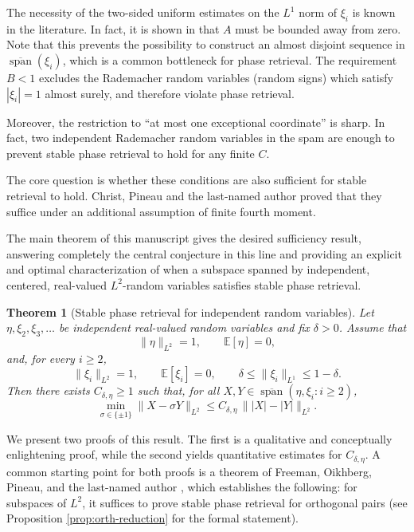\documentclass[11pt]{amsart}
\numberwithin{equation}{section}
\newtheorem{theorem}{Theorem}[section]
\theoremstyle{definition}
\theoremstyle{remark}
\newcommand{\E}{\mathbb E}
\newcommand{\Span}{\operatorname{span}}
\newcommand{\abs}[1]{\lvert #1 \rvert}
\newcommand{\norm}[1]{\lVert #1 \rVert}
\begin{document}
The necessity of the two-sided uniform estimates on the $L^1$ norm of $\xi_i$ is known in the literature. In fact, it is shown in \cite{FOTP} that $A$ must be bounded away from zero. Note that this prevents the possibility to construct an almost disjoint sequence in $\overline{\Span}(\xi_i)$, which is a common bottleneck for phase retrieval. The requirement $B<1$ excludes the Rademacher
random variables (random signs) which satisfy $|\xi_i|=1$ almost surely, and therefore violate phase retrieval.

Moreover, the restriction to “at most one exceptional coordinate” is sharp. In fact, two independent Rademacher random variables in the spam are enough to prevent stable phase retrieval to hold for any finite $C$. 

The core question is whether these conditions are also sufficient for stable retrieval to hold. Christ, Pineau and the last-named author \cite{christ2022examples} proved that they suffice under an additional assumption of finite fourth moment. 

The main theorem of this manuscript gives the desired sufficiency result, answering completely the central conjecture in this line and providing an explicit and optimal characterization of when a subspace spanned by independent, centered, real-valued $L^2$-random variables satisfies stable phase retrieval. 

\begin{theorem}[Stable phase retrieval for independent random variables]\label{thm:main}
Let $\eta,\xi_2,\xi_3,\dots$ be independent real-valued random variables and
fix $\delta>0$.  Assume that
\[
\norm{\eta}_{L^2}=1,
\qquad
\E[\eta]=0,
\]
and, for every $i\ge2$,
\[
\norm{\xi_i}_{L^2}=1,
\qquad
\E[\xi_i]=0,
\qquad
\delta\le \norm{\xi_i}_{L^1}\le 1-\delta.
\]
Then there exists $C_{\delta,\eta}\ge1$ such that, for all
$X,Y\in \overline{\Span}(\eta,\xi_i:i\ge2)$,
\[
\min_{\sigma\in\{\pm1\}}\norm{X-\sigma Y}_{L^2}
\le
C_{\delta,\eta}\,\norm{\abs{X}-\abs{Y}}_{L^2}.
\]
\end{theorem}

We present two proofs of this result. The first is a qualitative and conceptually enlightening proof, while the second yields quantitative estimates for $C_{\delta,\eta}$. A common starting point for both proofs is 
a theorem of Freeman, Oikhberg, Pineau, and the last-named author \cite{FOTP}, which establishes the following: for subspaces of $L^2$, it suffices to prove stable phase retrieval for orthogonal pairs (see Proposition \ref{prop:orth-reduction} for the formal statement).
\end{document}
